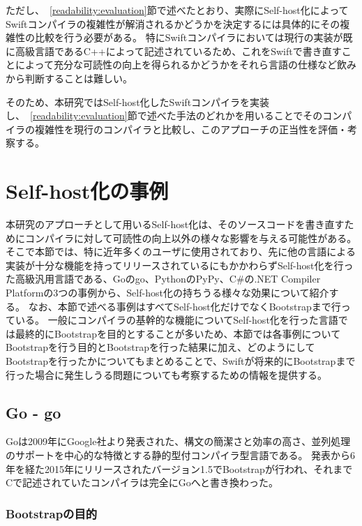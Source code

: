 ただし、~\ref{readability:evaluation}節で述べたとおり、実際にSelf-host化によってSwiftコンパイラの複雑性が解消されるかどうかを決定するには具体的にその複雑性の比較を行う必要がある。
特にSwiftコンパイラにおいては現行の実装が既に高級言語であるC++によって記述されているため、これをSwiftで書き直すことによって充分な可読性の向上を得られるかどうかをそれら言語の仕様など飲みから判断することは難しい。

そのため、本研究ではSelf-host化したSwiftコンパイラを実装し、~\ref{readability:evaluation}節で述べた手法のどれかを用いることでそのコンパイラの複雑性を現行のコンパイラと比較し、このアプローチの正当性を評価・考察する。

\section{Self-host化の事例}
\label{side-effect:instance}

本研究のアプローチとして用いるSelf-host化は、そのソースコードを書き直すためにコンパイラに対して可読性の向上以外の様々な影響を与える可能性がある。
そこで本節では、特に近年多くのユーザに使用されており、先に他の言語による実装が十分な機能を持ってリリースされているにもかかわらずSelf-host化を行った高級汎用言語である、Goのgo、PythonのPyPy、C\#の.NET Compiler Platformの3つの事例から、Self-host化の持ちうる様々な効果について紹介する。
なお、本節で述べる事例はすべてSelf-host化だけでなくBootstrapまで行っている。
一般にコンパイラの基幹的な機能についてSelf-host化を行った言語では最終的にBootstrapを目的とすることが多いため、本節では各事例についてBootstrapを行う目的とBootstrapを行った結果に加え、どのようにしてBootstrapを行ったかについてもまとめることで、Swiftが将来的にBootstrapまで行った場合に発生しうる問題についても考察するための情報を提供する。

\subsection{Go - go}
\label{side-effect:instance:go}

Goは2009年にGoogle社より発表された、構文の簡潔さと効率の高さ、並列処理のサポートを中心的な特徴とする静的型付コンパイラ型言語である。
発表から6年を経た2015年にリリースされたバージョン1.5でBootstrapが行われ、それまでCで記述されていたコンパイラは完全にGoへと書き換わった。~\cite{go}

\subsubsection{Bootstrapの目的}

